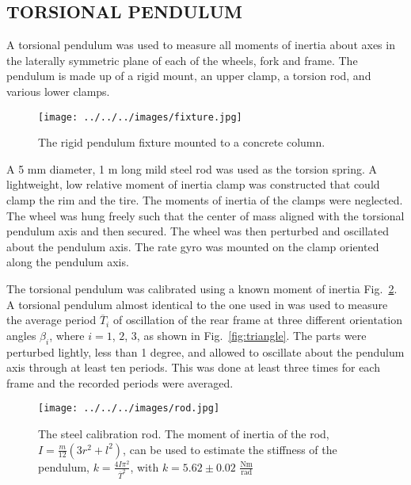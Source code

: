 \documentclass{bmd2010p}
\begin{document}
\subsection{TORSIONAL PENDULUM}
A torsional pendulum was used to measure all moments of inertia about axes
in the laterally symmetric plane of each of the wheels, fork and frame. The
pendulum is made up of a rigid mount, an upper clamp, a torsion rod, and
various lower clamps.
\begin{figure}[tb]
    \begin{center}
        \texttt{[image: ../../../images/fixture.jpg]}
    \end{center}
    \caption{The rigid pendulum fixture mounted to a concrete column.}
    \label{fig:fixture}
\end{figure}
A 5 mm diameter, 1 m long mild steel rod was used as the torsion
spring. A lightweight, low relative moment of inertia clamp was constructed
that could clamp the rim and the tire. The moments of inertia of the clamps
were neglected. The wheel was hung freely such that the
center of mass aligned with the torsional pendulum axis and then
secured. The wheel was then perturbed and oscillated about the pendulum
axis. The rate gyro was mounted on the clamp oriented along the pendulum
axis.

The torsional pendulum was calibrated using a known moment of
inertia Fig.~\ref{fig:rod}. A torsional pendulum almost identical to the one used in
\cite{Kooijman2006} was used to measure the average period $\overline{T}_i$ of
oscillation of the rear frame at three different
orientation angles $\beta_i$, where $i=1$, $2$, $3$, as shown in
Fig.~\ref{fig:triangle}. The parts were perturbed lightly, less than 1 degree,
and allowed to oscillate about the pendulum axis through at least ten periods.
This was done at least three times for each frame and the recorded periods were
averaged.
\begin{figure}[tb]
    \begin{center}
        \texttt{[image: ../../../images/rod.jpg]}
    \end{center}
    \caption{The steel calibration rod. The moment of inertia of the rod,
    $I=\frac{m}{12}(3r^2+l^2)$, can be used to estimate the stiffness of the
    pendulum, $k=\frac{4I\pi^2}{\overline{T}^2}$, with $k=5.62\pm0.02$ $\frac{\textrm{Nm}}{\textrm{rad}}$}
    \label{fig:rod}
\end{figure}
\end{document}
